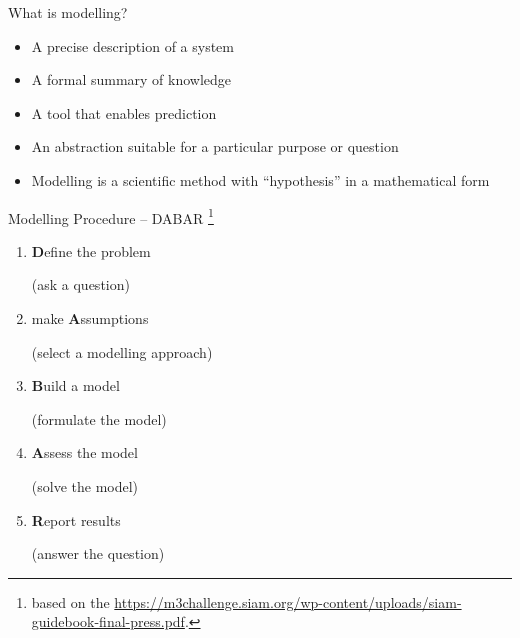 \documentclass{workbook}
\begin{document}
\begin{slide}

\question 

\begin{parts}
	\item What is modelling?
\end{parts}



\begin{solution}
	\begin{itemize}
		\item A precise description of a system
		\item A formal summary of knowledge
		\item A tool that enables prediction
		\item An abstraction suitable for a particular purpose or question
		\item Modelling is a scientific method with ``hypothesis'' in a mathematical form	
	\end{itemize}	
\end{solution}
	
\end{slide}




\begin{slide}
\begin{parts}
\setcounter{partsitem}{1}
	\item Modelling Procedure -- DABAR \footnote{based on the \href{SIAM $M^2 (GS)^2$ Textbook}{https://m3challenge.siam.org/wp-content/uploads/siam-guidebook-final-press.pdf}.}
	
	\begin{enumerate}
		\item[\it Step 1.] \textbf{\large D}efine the problem 
			\begin{solution}\hfill (ask a question)\end{solution}

		\item[\it Step 2.] make \textbf{\large A}ssumptions 
			\begin{solution}\hfill (select a modelling approach)\end{solution}

		\item[\it Step 3.] \textbf{\large B}uild a model
			\begin{solution} \hfill (formulate the model)\end{solution}

		\item[\it Step 4.] \textbf{\large A}ssess the model 
			\begin{solution} \hfill (solve the model) \end{solution}

		\item[\it Step 5.] \textbf{\large R}eport results
			\begin{solution} \hfill (answer the question) \end{solution}
	\end{enumerate}	
\end{parts}

	
\end{slide}
\end{document}
